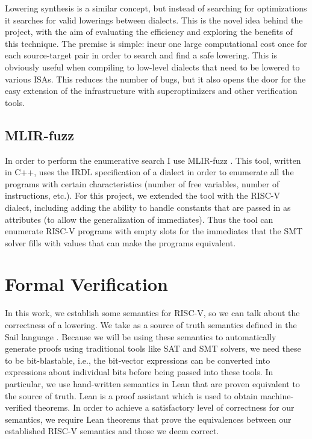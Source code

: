 Lowering synthesis is a similar concept, but instead of searching for optimizations it searches
for valid lowerings between dialects. This is the novel idea behind the project, with the aim of
evaluating the efficiency and exploring the benefits of this technique.
%
The premise is simple: incur one large computational cost once for each source-target pair 
in order to search and find a safe lowering. This is obviously useful when compiling
to low-level dialects that need to be lowered to various ISAs.
%
This reduces the number of bugs, but it also opens the door for the easy extension of the 
infrastructure with superoptimizers and other verification tools.

\subsection*{MLIR-fuzz}

In order to perform the enumerative search I use MLIR-fuzz \cite{mlir-fuzz}.
This tool, written in C++, uses the IRDL specification of a dialect in order to 
enumerate all the programs with certain characteristics (number of free variables,
number of instructions, etc.).
%
For this project, we extended the tool with the RISC-V dialect, including adding the ability 
to handle constants that are passed in as attributes (to allow the generalization of immediates).
Thus the tool can enumerate RISC-V programs with empty slots for the immediates that
the SMT solver fills with values that can make the programs equivalent.

\section{Formal Verification}

In this work, we establish some semantics for RISC-V, so we can talk about the correctness
of a lowering. We take as a source of truth semantics defined in the Sail language \cite{sail-paper}.
Because we will be using these semantics to automatically generate proofs using traditional tools
like SAT and SMT solvers, we need these to be bit-blastable, i.e., the bit-vector expressions can be converted
into expressions about individual bits before being passed into these tools. In particular, we 
use hand-written semantics in Lean that are proven equivalent to the source of truth. \cite{riscv-lean}
%
Lean is a proof assistant which is used to obtain machine-verified theorems. In order to achieve
a satisfactory level of correctness for our semantics, we require Lean theorems that prove the
equivalences between our established RISC-V semantics and those we deem correct. 

